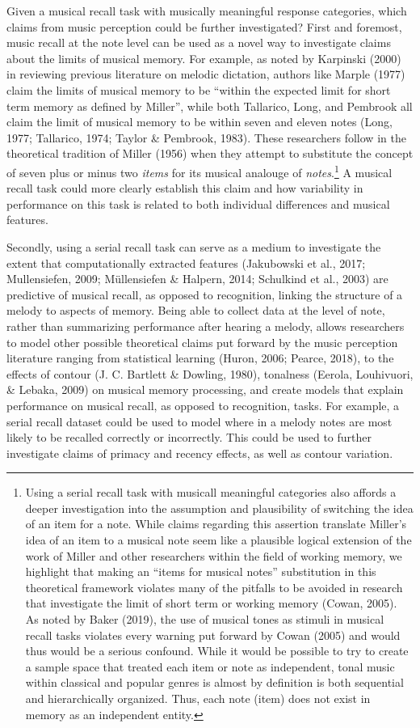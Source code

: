 \documentclass[english,man,floatsintext]{apa6}
\begin{document}
Given a musical recall task with musically meaningful response categories, which claims from music perception could be further investigated?
First and foremost, music recall at the note level can be used as a novel way to investigate claims about the limits of musical memory.
For example, as noted by Karpinski (2000) in reviewing previous literature on melodic dictation, authors like Marple (1977) claim the limits of musical memory to be \enquote{within the expected limit for short term memory as defined by Miller}, while both Tallarico, Long, and Pembrook all claim the limit of musical memory to be within seven and eleven notes (Long, 1977; Tallarico, 1974; Taylor \& Pembrook, 1983).
These researchers follow in the theoretical tradition of Miller (1956) when they attempt to substitute the concept of seven plus or minus two \emph{items} for its musical analouge of \emph{notes}.\footnote{Using a serial recall task with musicall meaningful categories also affords a deeper investigation into the assumption and plausibility of switching the idea of an item for a note. While claims regarding this assertion translate Miller's idea of an item to a musical note seem like a plausible logical extension of the work of Miller and other researchers within the field of working memory, we highlight that making an ``items for musical notes'' substitution in this theoretical framework violates many of the pitfalls to be avoided in research that investigate the limit of short term or working memory (Cowan, 2005). As noted by Baker (2019), the use of musical tones as stimuli in musical recall tasks violates every warning put forward by Cowan (2005) and would thus would be a serious confound. While it would be possible to try to create a sample space that treated each item or note as independent, tonal music within classical and popular genres is almost by definition is both sequential and hierarchically organized. Thus, each note (item) does not exist in memory as an independent entity.}
A musical recall task could more clearly establish this claim and how variability in performance on this task is related to both individual differences and musical features.

Secondly, using a serial recall task can serve as a medium to investigate the extent that computationally extracted features (Jakubowski et al., 2017; Mullensiefen, 2009; Müllensiefen \& Halpern, 2014; Schulkind et al., 2003) are predictive of musical recall, as opposed to recognition, linking the structure of a melody to aspects of memory.
Being able to collect data at the level of note, rather than summarizing performance after hearing a melody, allows researchers to model other possible theoretical claims put forward by the music perception literature ranging from statistical learning (Huron, 2006; Pearce, 2018), to the effects of contour (J. C. Bartlett \& Dowling, 1980), tonalness (Eerola, Louhivuori, \& Lebaka, 2009) on musical memory processing, and create models that explain performance on musical recall, as opposed to recognition, tasks.
For example, a serial recall dataset could be used to model where in a melody notes are most likely to be recalled correctly or incorrectly.
This could be used to further investigate claims of primacy and recency effects, as well as contour variation.
\end{document}
